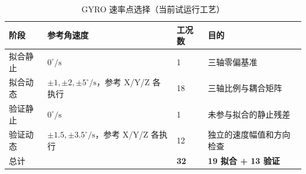 \begin{table}[H]\centering
\caption{GYRO 速率点选择（当前试运行工艺）}
\noindent\begin{tabularx}{\linewidth}{@{}p{25mm}p{45mm}p{28mm}Y@{}}\toprule
阶段 & 参考角速度 & 工况数 & 目的\\\midrule
拟合静止 & $0^\circ/\mathrm{s}$ & 1 & 三轴零偏基准\\
拟合动态 & $\pm1,\pm2,\pm5^\circ/\mathrm{s}$，参考 X/Y/Z 各执行 & 18 & 三轴比例与耦合矩阵\\
验证静止 & $0^\circ/\mathrm{s}$ & 1 & 未参与拟合的静止残差\\
验证动态 & $\pm1.5,\pm3.5^\circ/\mathrm{s}$，参考 X/Y/Z 各执行 & 12 & 独立的速度幅值和方向检查\\\midrule
总计 &  & \textbf{32} & \textbf{19 拟合 + 13 验证}\\\bottomrule
\end{tabularx}\end{table}
